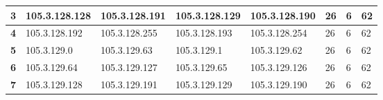 \begin{table}[H]
\begin{tabular}{@{}|l|l|l|l|l|l|l|l|@{}}
\textbf{3}               & 105.3.128.128                          & 105.3.128.191                                                                       & 105.3.128.129                                                                       & 105.3.128.190                                                                      & 26                                                           & 6                                                              & 62                                                             \\ \midrule
\textbf{4}               & 105.3.128.192                          & 105.3.128.255                                                                       & 105.3.128.193                                                                       & 105.3.128.254                                                                      & 26                                                           & 6                                                              & 62                                                             \\ \midrule
\textbf{5}               & 105.3.129.0                            & 105.3.129.63                                                                        & 105.3.129.1                                                                         & 105.3.129.62                                                                       & 26                                                           & 6                                                              & 62                                                             \\ \midrule
\textbf{6}               & 105.3.129.64                           & 105.3.129.127                                                                       & 105.3.129.65                                                                        & 105.3.129.126                                                                      & 26                                                           & 6                                                              & 62                                                             \\ \midrule
\textbf{7}               & 105.3.129.128                          & 105.3.129.191                                                                       & 105.3.129.129                                                                       & 105.3.129.190                                                                      & 26                                                           & 6                                                              & 62                                                             \\ \midrule

\end{tabular}
\end{table}

